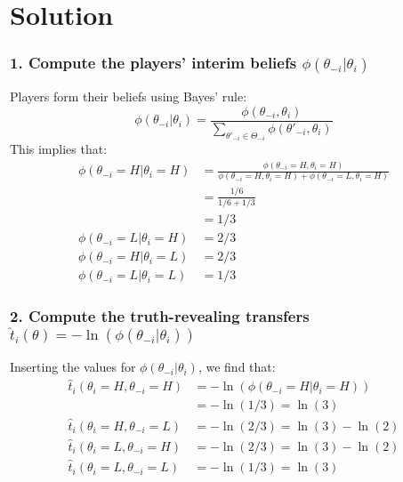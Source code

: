 \documentclass[a4paper]{article}
\newif\ifsolutions
\begin{document}
\ifsolutions
\section*{Solution}
	
	\subsubsection*{1. Compute the players' interim beliefs $\phi(\theta_{-i}|\theta_{i})$}
	Players form their beliefs using Bayes' rule:
	\begin{equation}
		\phi(\theta_{-i}|\theta_{i})=\frac{\phi(\theta_{-i},\theta_{i})}{\sum_{\theta'_{-i}\in\Theta_{-i}}\phi(\theta'_{-i},\theta_{i})}
	\end{equation}
	This implies that: 
	\begin{align}
		\phi(\theta_{-i}=H|\theta_{i}=H) &= \frac{\phi(\theta_{-i}=H,\theta_{i}=H)}{\phi(\theta_{-i}=H,\theta_{i}=H)+\phi(\theta_{-i}=L,\theta_{i}=H)} \nonumber \\ 
		&= \frac{1/6}{1/6 + 1/3} \nonumber \\ 
		&= 1/3\\
		\phi(\theta_{-i}=L|\theta_{i}=H)&=2/3\\
		\phi(\theta_{-i}=H|\theta_{i}=L)&=2/3\\
		\phi(\theta_{-i}=L|\theta_{i}=L)&=1/3
	\end{align}
	
	
	\subsubsection*{2. Compute the truth-revealing transfers $\hat{t}_{i}(\theta)=-\ln(\phi(\theta_{-i}|\theta_{i}))$}
	Inserting the values for $\phi(\theta_{-i}|\theta_{i})$, we find that:
	\begin{align}
		\hat{t}_{i}(\theta_{i}=H,\theta_{-i}=H)&=-\ln(\phi(\theta_{-i}=H|\theta_{i}=H)) \nonumber \\ 
		&= -\ln(1/3) = \ln(3)\\
		\hat{t}_{i}(\theta_{i}=H,\theta_{-i}=L)&=-\ln(2/3)=\ln(3)-\ln(2)\\
		\hat{t}_{i}(\theta_{i}=L,\theta_{-i}=H)&=-\ln(2/3)=\ln(3)-\ln(2)\\
		\hat{t}_{i}(\theta_{i}=L,\theta_{-i}=L)&=-\ln(1/3)=\ln(3)
	\end{align}
	
	
\end{document}
